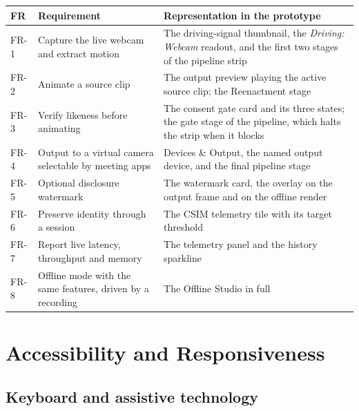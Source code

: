 \documentclass[11pt,a4paper]{report}
\begin{document}
\begin{longtable}{L{1.3cm} L{5.6cm} L{7.8cm}}
\toprule
\textbf{FR} & \textbf{Requirement} & \textbf{Representation in the prototype} \\
\midrule
\endhead
FR-1 & Capture the live webcam and extract motion &
  The driving-signal thumbnail, the \emph{Driving: Webcam} readout, and the
  first two stages of the pipeline strip \\
FR-2 & Animate a source clip &
  The output preview playing the active source clip; the Reenactment stage \\
FR-3 & Verify likeness before animating &
  The consent gate card and its three states; the gate stage of the pipeline,
  which halts the strip when it blocks \\
FR-4 & Output to a virtual camera selectable by meeting apps &
  Devices \& Output, the named output device, and the final pipeline stage \\
FR-5 & Optional disclosure watermark &
  The watermark card, the overlay on the output frame and on the offline
  render \\
FR-6 & Preserve identity through a session &
  The CSIM telemetry tile with its target threshold \\
FR-7 & Report live latency, throughput and memory &
  The telemetry panel and the history sparkline \\
FR-8 & Offline mode with the same features, driven by a recording &
  The Offline Studio in full \\
\bottomrule
\end{longtable}

\chapter{Accessibility and Responsiveness}

\section{Keyboard and assistive technology}
\end{document}
